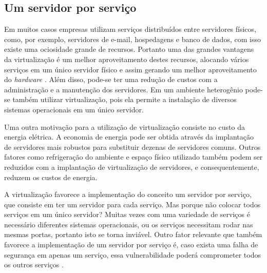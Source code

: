 \subsection{Um servidor por serviço}
\label{section:virtserv}

Em muitos casos empresas utilizam serviços distribuídos entre servidores físicos, como, por exemplo, servidores de e-mail, hospedagens e 
banco de dados, com isso existe uma ociosidade grande de recursos. Portanto uma das grandes vantagens da virtualização é um melhor 
aproveitamento destes recursos, alocando vários serviços em um único servidor físico e assim gerando um melhor aproveitamento do \textit{hardware} 
\cite{moreira2006}. Além disso, pode-se ter uma redução de custos com a administração e a manutenção dos servidores. Em um ambiente 
heterogênio pode-se também utilizar virtualização, pois ela permite a instalação de diversos sistemas operacionais em um único servidor.

Uma outra motivação para a utilização de virtualização consiste no custo da energia elétrica. A economia de energia pode ser obtida através 
da implantação de servidores mais robustos para substituir dezenas de servidores comuns. Outros fatores como refrigeração do ambiente e 
espaço físico utilizado também podem ser reduzidos com a implantação de virtualização de servidores, e consequentemente, reduzem os 
custos de energia.

A virtualização favorece a implementação do conceito um servidor por serviço, que consiste em ter um servidor para cada serviço.
Mas porque não colocar todos serviços em um único servidor? Muitas vezes com uma variedade de serviços é necessário diferentes 
sistemas operacionais, ou os serviços necessitam rodar nas mesmas portas, portanto isto se torna inviável. Outro fator relevante que 
também favorece a implementação de um servidor por serviço é, caso exista uma falha de segurança em apenas um serviço, essa 
vulnerabilidade poderá comprometer todos os outros serviços \cite{carissimi2008}.



